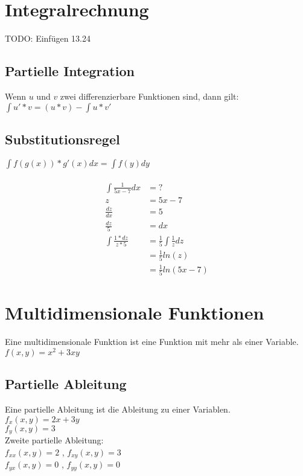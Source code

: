 \documentclass[a4paper,landscape, 11pt]{article}
\begin{document}
\begin{multicols}{4}
\begin{small}
    \section{Integralrechnung}
        TODO: Einfügen 13.24
        
        \subsection{Partielle Integration}
        Wenn $u$ und $v$ zwei differenzierbare Funktionen sind, dann gilt: \\
        $\int u' * v = (u * v) - \int u * v'$
        \subsection{Substitutionsregel}
        $\int f(g(x)) * g'(x) dx = \int f(y) dy$
        \\ \\
        \begin{align}
            \int \frac{1}{5x - 7} dx &= ?\\
            z &= 5x - 7 \\
            \frac{dz}{dx} &= 5 \\   
            \frac{dz}{5} &= dx  \\
            \int \frac{1 * dz}{z * 5} &= \frac{1}{5} \int \frac{1}{z} dz \\
                                      &= \frac{1}{5} ln(z) \\
                                      &= \frac{1}{5} ln(5x-7)
        \end{align}
    \section{Multidimensionale Funktionen}
        Eine multidimensionale Funktion ist eine Funktion mit mehr als einer Variable.\\
       $f(x,y) = x^2 + 3xy$  
       
       \subsection{Partielle Ableitung}
       Eine partielle Ableitung ist die Ableitung zu einer Variablen.\\
       $f_x(x,y) = 2x + 3y$ \\
       $f_y(x,y) = 3$ \\
       Zweite partielle Ableitung: \\
       $f_{xx}(x,y) = 2$ , 
       $f_{xy}(x,y) = 3$ \\
       $f_{yx}(x,y) = 0$ ,
       $f_{yy}(x,y) = 0$ 

\end{small}
\end{multicols}
\end{document}
